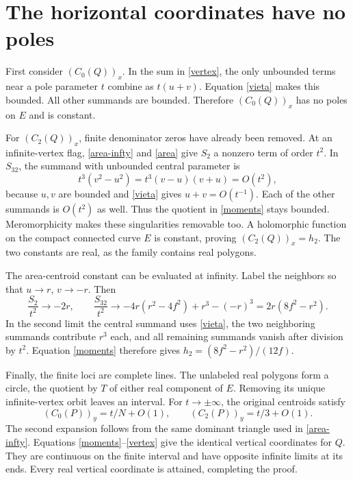 \documentclass[11pt]{article}
\begin{document}
\section*{The horizontal coordinates have no poles}
First consider $(C_0(Q))_x$. In the sum in \eqref{vertex}, the only
unbounded terms near a pole parameter $t$ combine as $t(u+v)$.
Equation \eqref{vieta} makes this bounded. All other summands are
bounded. Therefore $(C_0(Q))_x$ has no poles on $E$ and is constant.

For $(C_2(Q))_x$, finite denominator zeros have already been removed.
At an infinite-vertex flag, \eqref{area-infty} and \eqref{area}
give $S_2$ a nonzero term of order $t^2$. In $S_{32}$, the summand
with unbounded central parameter is
\[
 t^3(v^2-u^2)=t^3(v-u)(v+u)=O(t^2),
\]
because $u,v$ are bounded and \eqref{vieta} gives $u+v=O(t^{-1})$.
Each of the other summands is $O(t^2)$ as well. Thus the quotient
in \eqref{moments} stays bounded. Meromorphicity makes these
singularities removable too. A holomorphic function on the compact
connected curve $E$ is constant, proving $(C_2(Q))_x=h_2$.
The two constants are real, as the family contains real polygons.

The area-centroid constant can be evaluated at infinity. Label the
neighbors so that $u\to r$, $v\to-r$. Then
\[
 \frac{S_2}{t^2}\longrightarrow-2r,\qquad
 \frac{S_{32}}{t^2}\longrightarrow
 -4r(r^2-4f^2)+r^3-(-r)^3=2r(8f^2-r^2).
\]
In the second limit the central summand uses \eqref{vieta}, the two
neighboring summands contribute $r^3$ each, and all remaining summands
vanish after division by $t^2$. Equation \eqref{moments} therefore
gives $h_2=(8f^2-r^2)/(12f)$.

Finally, the finite loci are complete lines. The unlabeled real
polygons form a circle, the quotient by $T$ of either real component
of $E$. Removing its unique infinite-vertex orbit leaves an interval.
For $t\to\pm\infty$, the original centroids satisfy
\[
 (C_0(P))_y=t/N+O(1),\qquad (C_2(P))_y=t/3+O(1).
\]
The second expansion follows from the same dominant triangle used
in \eqref{area-infty}. Equations \eqref{moments}--\eqref{vertex}
give the identical vertical coordinates for $Q$. They are continuous
on the finite interval and have opposite infinite limits at its
ends. Every real vertical coordinate is attained, completing the proof.
\end{document}
